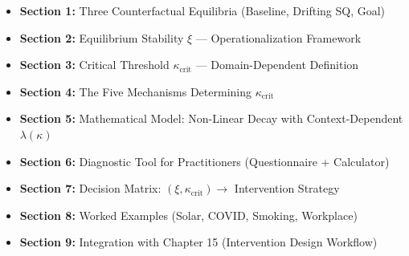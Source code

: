 \documentclass[11pt, a4paper]{article}
\begin{document}
\begin{itemize}
    \item \textbf{Section 1:} Three Counterfactual Equilibria (Baseline, Drifting SQ, Goal)
    \item \textbf{Section 2:} Equilibrium Stability $\xi$ — Operationalization Framework
    \item \textbf{Section 3:} Critical Threshold $\kappa_{\text{crit}}$ — Domain-Dependent Definition
    \item \textbf{Section 4:} The Five Mechanisms Determining $\kappa_{\text{crit}}$
    \item \textbf{Section 5:} Mathematical Model: Non-Linear Decay with Context-Dependent $\lambda(\kappa)$
    \item \textbf{Section 6:} Diagnostic Tool for Practitioners (Questionnaire + Calculator)
    \item \textbf{Section 7:} Decision Matrix: $(\xi, \kappa_{\text{crit}}) \to$ Intervention Strategy
    \item \textbf{Section 8:} Worked Examples (Solar, COVID, Smoking, Workplace)
    \item \textbf{Section 9:} Integration with Chapter 15 (Intervention Design Workflow)
\end{itemize}


\end{document}
